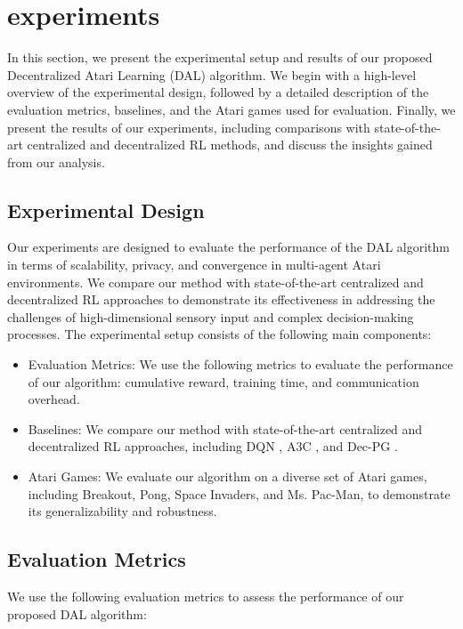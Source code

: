 \section{experiments}

In this section, we present the experimental setup and results of our proposed Decentralized Atari Learning (DAL) algorithm. We begin with a high-level overview of the experimental design, followed by a detailed description of the evaluation metrics, baselines, and the Atari games used for evaluation. Finally, we present the results of our experiments, including comparisons with state-of-the-art centralized and decentralized RL methods, and discuss the insights gained from our analysis.

\subsection{Experimental Design}

Our experiments are designed to evaluate the performance of the DAL algorithm in terms of scalability, privacy, and convergence in multi-agent Atari environments. We compare our method with state-of-the-art centralized and decentralized RL approaches to demonstrate its effectiveness in addressing the challenges of high-dimensional sensory input and complex decision-making processes. The experimental setup consists of the following main components:

\begin{itemize}
    \item Evaluation Metrics: We use the following metrics to evaluate the performance of our algorithm: cumulative reward, training time, and communication overhead.
    \item Baselines: We compare our method with state-of-the-art centralized and decentralized RL approaches, including DQN \citep{mnih2013playing}, A3C \citep{mnih2016asynchronous}, and Dec-PG \citep{lu2021decentralized}.
    \item Atari Games: We evaluate our algorithm on a diverse set of Atari games, including Breakout, Pong, Space Invaders, and Ms. Pac-Man, to demonstrate its generalizability and robustness.
\end{itemize}

\subsection{Evaluation Metrics}

We use the following evaluation metrics to assess the performance of our proposed DAL algorithm:

